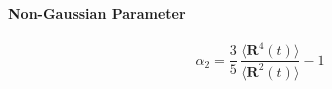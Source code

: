 \documentclass[a4paper,12pt]{article}
\renewcommand{\vec}[1]{\mathbf{#1}}
\begin{document}
\paragraph{Non-Gaussian Parameter}

\begin{equation}
\alpha_2 = \frac{3}{5}\,\frac{\langle{\vec{R}^4(t)\rangle}}{\langle{\vec{R}^2(t)\rangle}} - 1
\end{equation}

%
%
%
%
\end{document}
